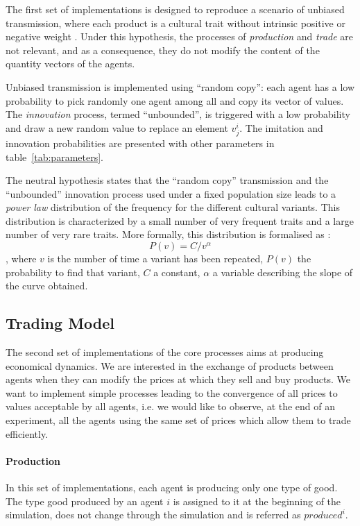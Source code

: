 \documentclass{wscpaperproc}
\begin{document}
The first set of implementations is designed to reproduce a scenario of unbiased transmission, where each product is a cultural trait without intrinsic positive or negative weight \cite{bentley_random_2004,bentley_specialisation_2005,mesoudi_random_2009}. 
Under this hypothesis, the processes of \emph{production} and \emph{trade} are not relevant, and as a consequence, they do not modify the content of the quantity vectors of the agents.

Unbiased transmission is implemented using ``random copy'': each agent has a low probability to pick randomly one agent among all and copy its vector of values. The \emph{innovation} process, termed ``unbounded'', is triggered with a low probability and draw a new random value to replace an element $v^i_j$. The imitation and innovation probabilities are presented with other parameters in table~\ref{tab:parameters}.

The neutral hypothesis states that the ``random copy'' transmission and the ``unbounded'' innovation process used under a fixed population size leads to a \emph{power law} distribution of the frequency for the different cultural variants. This distribution is characterized by a small number of very frequent traits and a large number of very rare traits. 
More formally, this distribution is formalised as : $$P(v)=C/v^\alpha $$, where $v$ is the number of time a variant has been repeated, $P(v)$ the probability to find that variant, $C$ a constant, $\alpha$ a variable describing the slope of the curve obtained. 

\subsection{Trading Model}\label{sec:trade}

The second set of implementations of the core processes aims at producing economical dynamics. We are interested in the exchange of products between agents when they can modify the prices at which they sell and buy products. We want to implement simple processes leading to the convergence of all prices to values acceptable by all agents, i.e. we would like to observe, at the end of an experiment, all the agents using the same set of prices which allow them to trade efficiently.

\paragraph{Production}
In this set of implementations, each agent is producing only one type of good. The type good produced by an agent $i$ is assigned to it at the beginning of the simulation, does not change through the simulation and is referred as $produced^i$. 
\end{document}
